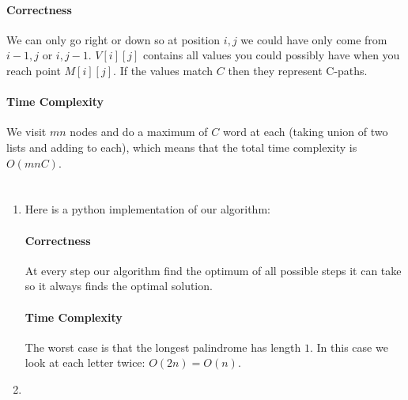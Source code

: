 \documentclass[12pt, a4paper]{article}
\begin{document}
\begin{enumerate}[a]
	\paragraph{Correctness}

	We can only go right or down so at position $i, j$ we could have only come from $i - 1, j$ or $i, j - 1$. $V[i][j]$ contains all values you could possibly have when you reach point $M[i][j]$. If the values match $C$ then they represent C-paths.

	\paragraph{Time Complexity}

	We visit $mn$ nodes and do a maximum of $C$ word at each (taking union of two lists and adding to each), which means that the total time complexity is $O(mnC)$.

\end{enumerate}

\section{} %
\begin{enumerate}[a]
	\item %
	Here is a python implementation of our algorithm:

	

	\paragraph{Correctness}

	At every step our algorithm find the optimum of all possible steps it can take so it always finds the optimal solution.

	\paragraph{Time Complexity}

	The worst case is that the longest palindrome has length $1$. In this case we look at each letter twice: $O(2n) = O(n)$.

	\item %
\end{enumerate}
\end{document}
